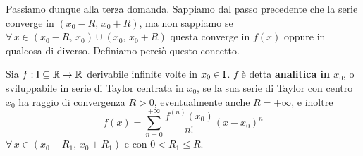 \documentclass[../../analisi2]{subfiles}
\begin{document}
        Passiamo dunque alla terza domanda. Sappiamo dal passo precedente che la serie converge in \((x_0 - R, \, x_0 + R)\), ma non
        sappiamo se \(\forall \, x \in (x_0 - R, \, x_0) \cup (x_0, \, x_0 + R)\) questa converge in \(f(x)\) oppure in qualcosa di
        diverso. Definiamo perciò questo concetto.

        \begin{definizione}
            Sia \(f : \mathrm{I} \subseteq \mathbb{R} \to \mathbb{R}\) derivabile infinite volte in \(x_0 \in \mathrm{I}\). \(f\) è detta \textbf{analitica in \(x_0\)},
            o sviluppabile in serie di Taylor centrata in \(x_0\), se la sua serie di Taylor con centro \(x_0\) ha raggio di convergenza
            \(R > 0\), eventualmente anche \(R = +\infty\), e inoltre
            \[
                f(x) = \sum_{n = 0}^{+\infty} \frac{f^{(n)} (x_0)}{n!} (x - x_0)^n
            \]
            \(\forall \, x \in (x_0 - R_1, \, x_0 + R_1)\) e con \(0 < R_1 \leqslant R\).
        \end{definizione}
\end{document}
